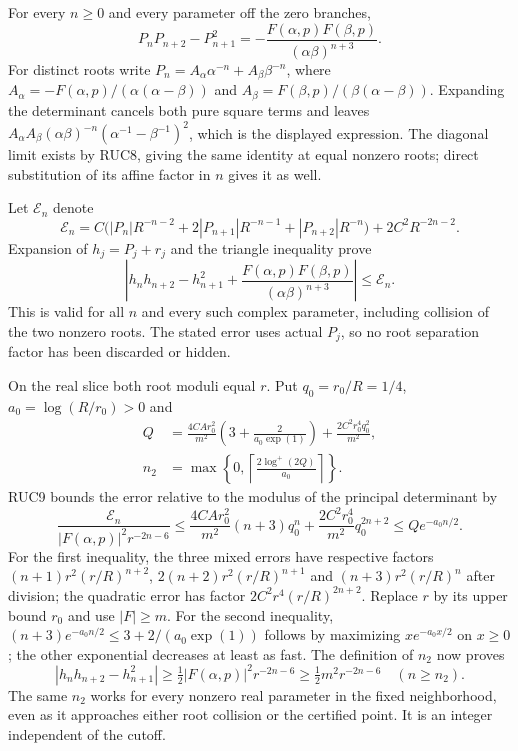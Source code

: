\documentclass[11pt]{article}
\begin{document}
For every $n\ge0$ and every parameter off the zero branches,
\[
 P_nP_{n+2}-P_{n+1}^2
       =-\frac{F(\alpha,p)F(\beta,p)}{(\alpha\beta)^{n+3}}.
 \tag{RUC17}
\]
For distinct roots write
$P_n=A_\alpha\alpha^{-n}+A_\beta\beta^{-n}$, where
$A_\alpha=-F(\alpha,p)/(\alpha(\alpha-\beta))$ and
$A_\beta=F(\beta,p)/(\beta(\alpha-\beta))$.
Expanding the determinant cancels both pure square terms and
leaves
$A_\alpha A_\beta(\alpha\beta)^{-n}(\alpha^{-1}-\beta^{-1})^2$,
which is the displayed expression.  The diagonal limit exists
by RUC8, giving the same identity at equal nonzero roots; direct
substitution of its affine factor in $n$ gives it as well.

Let $\mathcal E_n$ denote
\[
 \mathcal E_n=C\bigl(|P_n|R^{-n-2}
          +2|P_{n+1}|R^{-n-1}+|P_{n+2}|R^{-n}\bigr)
                    +2C^2R^{-2n-2}.
 \tag{RUC18}
\]
Expansion of $h_j=P_j+r_j$ and the triangle inequality prove
\[
 \left|h_nh_{n+2}-h_{n+1}^2
       +\frac{F(\alpha,p)F(\beta,p)}{(\alpha\beta)^{n+3}}\right|
       \le\mathcal E_n.
 \tag{RUC19}
\]
This is valid for all $n$ and every such complex parameter,
including collision of the two nonzero roots.  The stated
error uses actual $P_j$, so no root separation factor has been
discarded or hidden.

On the real slice both root moduli equal $r$.  Put
$q_0=r_0/R=1/4$, $a_0=\log(R/r_0)>0$ and
\[
 \begin{aligned}
 Q&=\frac{4CA r_0^2}{m^2}\left(3+\frac2{a_0\exp(1)}\right)
             +\frac{2C^2r_0^4q_0^2}{m^2},\\
 n_2&=\max\left\{0,
              \left\lceil\frac{2\log^+(2Q)}{a_0}\right\rceil\right\}.
 \end{aligned}\tag{RUC20}
\]
RUC9 bounds the error relative to the modulus of the principal
determinant by
\[
 \frac{\mathcal E_n}{|F(\alpha,p)|^2r^{-2n-6}}
 \le\frac{4CA r_0^2}{m^2}(n+3)q_0^n
                  +\frac{2C^2r_0^4}{m^2}q_0^{2n+2}
 \le Q e^{-a_0n/2}.
\]
For the first inequality, the three mixed errors have respective
factors $(n+1)r^2(r/R)^{n+2}$,
$2(n+2)r^2(r/R)^{n+1}$ and $(n+3)r^2(r/R)^n$ after division;
the quadratic error has factor $2C^2r^4(r/R)^{2n+2}$.
Replace $r$ by its upper bound $r_0$ and use $|F|\ge m$.
For the second inequality,
$(n+3)e^{-a_0n/2}\le3+2/(a_0\exp(1))$ follows by maximizing
$x e^{-a_0x/2}$ on $x\ge0$; the other exponential decreases
at least as fast.  The definition of $n_2$ now proves
\[
 |h_nh_{n+2}-h_{n+1}^2|
       \ge\tfrac12|F(\alpha,p)|^2r^{-2n-6}
       \ge\tfrac12m^2r^{-2n-6}\quad(n\ge n_2).
 \tag{RUC21}
\]
The same $n_2$ works for every nonzero real parameter in the
fixed neighborhood, even as it approaches either root collision
or the certified point.  It is an integer independent of the cutoff.
\end{document}
